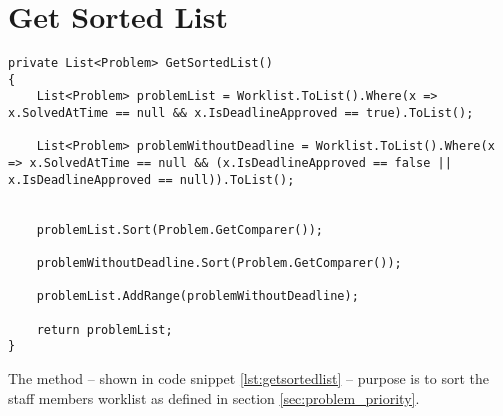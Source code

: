 \section{Get Sorted List}
\label{sec:getsortedlist}



\begin{lstlisting}[style=sourceCode, caption=\myCaption{The ManageTagTimes method}, label=lst:getsortedlist,float=hp]
private List<Problem> GetSortedList()
{
    List<Problem> problemList = Worklist.ToList().Where(x => x.SolvedAtTime == null && x.IsDeadlineApproved == true).ToList();

    List<Problem> problemWithoutDeadline = Worklist.ToList().Where(x => x.SolvedAtTime == null && (x.IsDeadlineApproved == false || x.IsDeadlineApproved == null)).ToList();


    problemList.Sort(Problem.GetComparer());

    problemWithoutDeadline.Sort(Problem.GetComparer());

    problemList.AddRange(problemWithoutDeadline);

    return problemList;
}
\end{lstlisting}

The  method -- shown in code snippet \ref{lst:getsortedlist} -- purpose is to sort the staff members worklist as defined in section \ref{sec:problem_priority}. 

